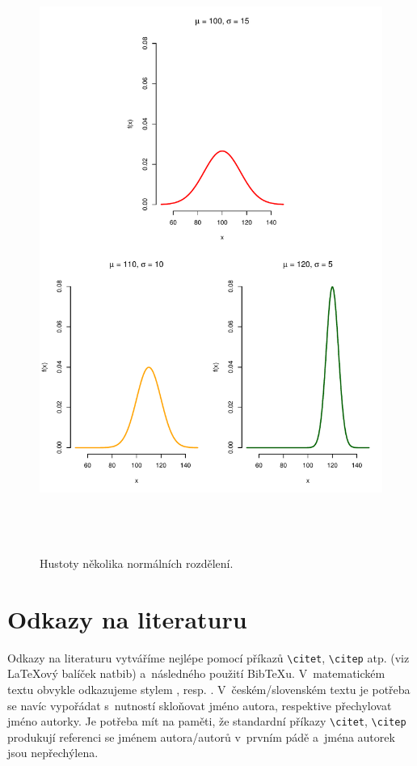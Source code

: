 \begin{figure}[p]\centering
      \includegraphics[width=140mm, height=198mm]{../img/ukazka-obr03}
      \caption{Hustoty několika normálních rozdělení.}
      \label{obr03:Nhust:podruhe}

\end{figure}

\chapter{Odkazy na literaturu}

Odkazy na literaturu vytváříme nejlépe pomocí příkazů
\verb|\citet|, \verb|\citep| atp.
(viz {\LaTeX}ový balíček \textsf{natbib}) a~následného použití
Bib{\TeX}u. V~matematickém textu obvykle odkazujeme stylem , resp. . V~českém/slovenském textu je potřeba se navíc vypořádat
s~nutností skloňovat jméno autora, respektive přechylovat jméno
autorky. Je potřeba mít na paměti, že standardní příkazy
\verb|\citet|, \verb|\citep|
produkují referenci se jménem autora/autorů v~prvním pádě a~jména
autorek jsou nepřechýlena.

